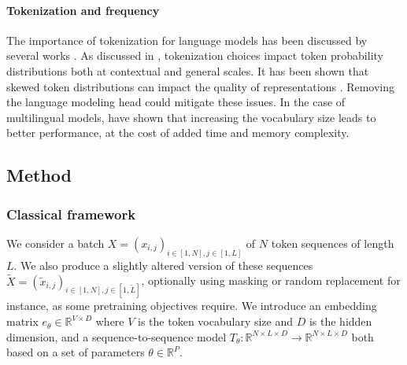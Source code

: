 \paragraph{Tokenization and frequency}
The importance of tokenization for language models has been discussed by several works \citep{rust-etal-2021-good,zouhar-etal-2023-tokenization}. As discussed in \citet{zouhar-etal-2023-tokenization}, tokenization choices impact token probability distributions both at contextual and general scales. It has been shown that skewed token distributions can impact the quality of representations \citep{gao2018representation,zhou2021frequencybased,puccetti-etal-2022-outlier,yu-etal-2022-rare}. Removing the language modeling head could mitigate these issues. In the case of multilingual models, \citet{liang2023xlmv} have shown that increasing the vocabulary size leads to better performance, at the cost of added time and memory complexity.


\subsection{Method}
\subsubsection{Classical framework}
\label{sec:cwt}

We consider a batch $X = (x_{i,j})_{i \in [1, N], j \in [1,L]}$ of $N$ token sequences of length $L$. We also produce a slightly altered version of these sequences $\tilde{X} = (\tilde{x}_{i,j})_{i \in [1, N], j \in [1,\tilde{L}]}$, optionally using masking or random replacement for instance, as some pretraining objectives require. We introduce an embedding matrix $e_\theta \in \mathbb{R}^{V \times D}$ where $V$ is the token vocabulary size and $D$ is the hidden dimension, and a sequence-to-sequence model $T_\theta: \mathbb{R}^{N\times L\times D} \rightarrow \mathbb{R}^{N\times L\times D}$ both based on a set of parameters $\theta \in \mathbb{R}^P$.

